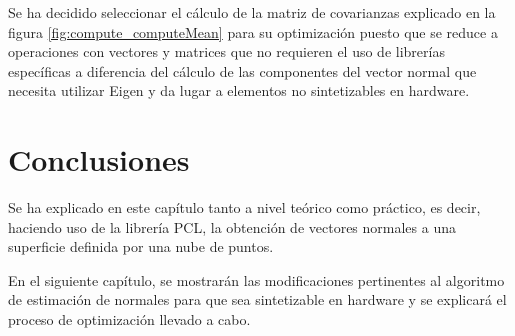 Se ha decidido seleccionar el cálculo de la matriz de covarianzas explicado en la figura \ref{fig:compute_computeMean} para su optimización puesto que se reduce a operaciones con vectores y matrices que no requieren el uso de librerías específicas a diferencia del cálculo de las componentes del vector normal que necesita utilizar Eigen y da lugar a elementos no sintetizables en hardware. 

\section{Conclusiones}

Se ha explicado en este capítulo tanto a nivel teórico como práctico, es decir, haciendo uso de la librería PCL, la obtención de vectores normales a una superficie definida por una nube de puntos.

En el siguiente capítulo, se mostrarán las modificaciones pertinentes al algoritmo de estimación de normales para que sea sintetizable en hardware y se explicará el proceso de optimización llevado a cabo.
